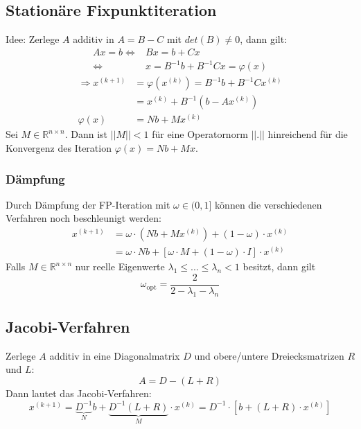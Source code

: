 \documentclass[4pt,a4paper]{scrartcl}
\begin{document}
\begin{multicols}{4}
\subsection{Stationäre Fixpunktiteration}
Idee: Zerlege $A$ additiv in $A=B-C$ mit $det(B)\neq 0$, dann gilt:
\begin{equation*}
\begin{split}
Ax=b\Leftrightarrow &Bx=b+Cx\\
\Leftrightarrow &x=B^{-1}b+B^{-1}Cx=\varphi(x)
\end{split}
\end{equation*}
\begin{equation*}
\begin{split}
\Rightarrow x^{(k+1)}&=\varphi\left(x^{(k)}\right)=B^{-1}b+B^{-1}Cx^{(k)}\\
&=x^{(k)}+B^{-1}\left(b-Ax^{(k)}\right)\\
\varphi(x)&=Nb+Mx^{(k)}
\end{split}
\end{equation*}
Sei $M\in\mathbb{R}^{n\times n}$. Dann ist $||M||<1$ für eine Operatornorm $||.||$ hinreichend für die Konvergenz des Iteration $\varphi(x)=Nb+Mx$.

\subsubsection{Dämpfung}
Durch Dämpfung der FP-Iteration mit $\omega\in(0,1]$ können die verschiedenen Verfahren noch beschleunigt werden:
\begin{equation*}
\begin{split}
x^{(k+1)}&=\omega\cdot\left(Nb+Mx^{(k)}\right)+(1-\omega)\cdot x^{(k)}\\
&=\omega\cdot Nb+[\omega\cdot M+(1-\omega)\cdot I]\cdot x^{(k)}
\end{split}
\end{equation*}
Falls $M\in\mathbb{R}^{n\times n}$ nur reelle Eigenwerte $\lambda_1\leq ...\leq\lambda_n<1$ besitzt, dann gilt
\begin{equation*}
\omega_{\text{opt}}=\frac{2}{2-\lambda_1-\lambda_n}
\end{equation*}

\subsection{Jacobi-Verfahren}
Zerlege $A$ additiv in eine Diagonalmatrix $D$ und obere/untere Dreiecksmatrizen $R$ und $L$:
\begin{equation*}
A=D-(L+R)
\end{equation*}
Dann lautet das Jacobi-Verfahren:
\begin{equation*}
x^{(k+1)}=\underbrace{D^{-1}}_{N}b+\underbrace{D^{-1}(L+R)}_{M}\cdot x^{(k)}=D^{-1}\cdot \left[b+(L+R)\cdot x^{(k)}\right]
\end{equation*}


\end{multicols}
\end{document}
